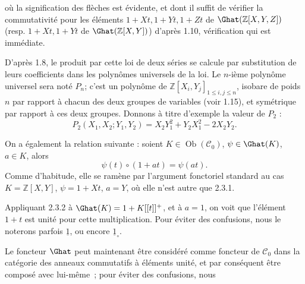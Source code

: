 
où la
signification des flèches est évidente, et dont il suffit de vérifier la commutativité pour les éléments \(1+Xt,1+Yt,1+Zt\) de \(\Ghat(\mathbb Z[X,Y,Z])\) (resp. \(1+Xt,1+Yt\) de \(\Ghat(\mathbb Z[X,Y])\)) d'après 1.10, vérification qui est immédiate.

D'après 1.8, le produit par cette loi de deux séries se calcule par substitution de leurs coefficients dans les polynômes universels de la loi. Le \(n\)-ième polynôme universel sera noté \(P_n\); c'est un polynôme de \(\mathbb Z[X_i,Y_j]_{1\leq i,j\leq n}\), isobare de poids \(n\) par rapport à chacun des deux groupes de variables (voir 1.15), et symétrique par rapport à ces deux groupes. Donnons à titre d'exemple la valeur de \(P_2\) :
\[
  P_2(X_1,X_2;Y_1,Y_2)=X_2Y_1^2+Y_2X_1^2-2X_2Y_2.
\]

On a également la relation suivante : soient \(K\in\operatorname{Ob}(\mathcal C_0)\), \(\psi\in\Ghat(K)\), \(a\in K\), alors
\begin{equation}\tag{2.3.2}
  \psi(t)\circ(1+at)=\psi(at).
\end{equation}
Comme d'habitude, elle se ramène par l'argument fonctoriel standard au cas \(K=\mathbb Z[X,Y]\), \(\psi=1+Xt\), \(a=Y\), où elle n'est autre que 2.3.1.

Appliquant 2.3.2 à \(\Ghat(K)=1+K[[t]]^+\), et à \(a=1\), on voit que l'élément \(1+t\) est unité pour cette multiplication. Pour éviter des confusions, nous le noterons parfois \(\underline{1}\), ou encore \(\underline{1}_\circ\).

Le foncteur \(\Ghat\) peut maintenant être considéré comme foncteur de \(\mathcal C_0\) dans la catégorie des anneaux commutatifs à éléments unité, et par conséquent être composé avec lui-même~; pour éviter des confusions,
nous 

